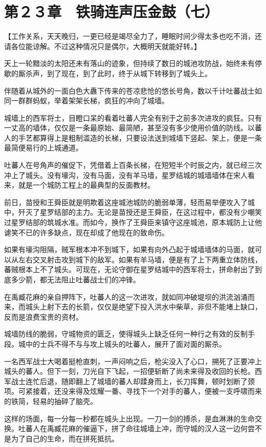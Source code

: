 \section{第２３章　铁骑连声压金鼓（七）}

【工作关系，天天晚归，一更已经是竭尽全力了，睡眠时间少得太多也吃不消，还请各位能谅解。不过这种情况只是偶尔，大概明天就能好转。】

天上一轮黯淡的太阳还未有落山的迹象，但持续了数日的城池攻防战，始终未有停歇的厮杀声，到了现在，到了此时，终于从城下转移到了城头上。

伴随着从城外的一面白色大纛下传来的苍凉悲怆的悠长号角，数以千计吐蕃战士如同一群群蚂蚁，举着架架长梯，疯狂的冲向了城墙。

城墙上的西军将士，目瞪口呆的看着吐蕃人完全有别于之前多次进攻的疯狂。只有一丈高的墙体，仅仅是一条最原始、最简陋，甚至没有多少使用价值的防线。以蕃人的手艺都算得上是粗制滥造的长梯，只要设法送到城墙下竖起、架上，便是一条最简便易行的上城通道。

吐蕃人在号角声的催促下，凭借着上百条长梯，在短短半个时辰之内，就已经三次冲上了城头。没有壕沟，没有马面，没有羊马墙，星罗结城的城墙墙体在宋人看来，就是一个城防工程上的最典型的反面教材。

前日，苗授和王舜臣就是明欺着这座城池城防的脆弱单薄，轻而易举便攻入了城中，歼灭了星罗结部的主力。无论是苗授还是王舜臣，在这过程中，都没有少嘲笑过星罗结部的筑城水准。而如今，换作了王舜臣来镇守这座城池，原本城防上让他谑笑不已的许多缺点，现在却成了他现在的致命伤。

如果有壕沟阻隔，贼军根本冲不到城下，如果有向外凸起于城墙墙体的马面，就可以从左右交叉射击攻到城下的敌军。如果有羊马墙，便是有了上下两重立体防线，蕃贼根本上不了城头。可现在，无论守御在星罗结城中的西军将士，拼命射出了到底多少箭，都无法阻止吐蕃战士们的冲锋。

在禹臧花麻的亲自押阵下，吐蕃人的这一次进攻，就如同冲破堤坝的洪流汹涌而来，而城头上射下去的长箭，仅仅是绝望下投入洪水中柴草，非但不能堵上缺口，反而是浪费宝贵的资材。

城墙防线的脆弱，守城物资的匮乏，使得城头上缺乏任何一种行之有效的反制手段。城中的士兵不得不与与攻上城头的吐蕃人，展开了面对面的厮杀。

一名西军战士大喝着挺枪直刺，一声闷响之后，枪尖没入了心口，搠死了正要冲上城头的蕃人。但下一刻，刀光自下飞起，一招便斩断了尚未来得及收回的长枪。西军战士连忙后退，随即翻上了城墙的蕃人却蹂身而上，长刀挥舞，顿时划断了颈项。可紧接着，还没来得及炫耀一番、寻找下一个对手的蕃人，便被一支呼啸而来的铁简，轻易的抽碎了脑壳。

这样的场面，每一分每一秒都在城头上出现。一刀一剑的搏杀，是血淋淋的生命交换。吐蕃人在禹臧花麻的催逼下，拼了命往城墙上冲，而守城的汉人这一边何尝不是为了自己的生命，而在拼死抵抗。

